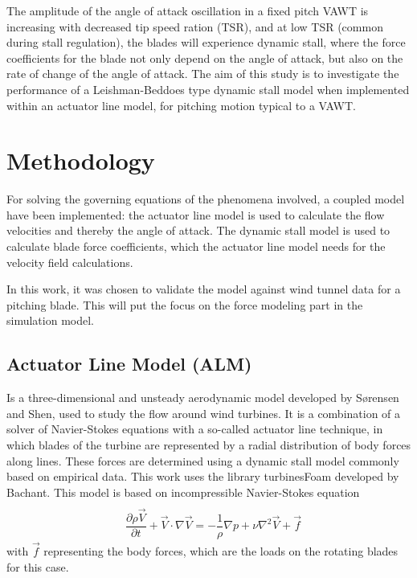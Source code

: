 \documentclass[a4paper]{jpconf}
\begin{document}
The amplitude of the angle of attack oscillation in a fixed pitch VAWT is increasing
with decreased tip speed
ration (TSR), and at low TSR (common during stall regulation), the blades will
experience dynamic stall, where the force coefficients for the blade not only
depend on the angle of attack, but also on the rate of change of the angle of
attack. The aim of this study is to investigate the performance of a
Leishman-Beddoes type dynamic stall model when implemented within an actuator
line model, for pitching motion typical to a VAWT.

\section{Methodology}
For solving the governing equations of the phenomena involved, a coupled model have
been implemented: the actuator line model is used to calculate the flow
velocities and thereby the angle of attack. The dynamic stall model is used to
calculate blade force coefficients, which the actuator line model needs for the
velocity field calculations.

In this work, it was chosen to validate the model
against wind tunnel data for a pitching blade. This will put the focus on the
force modeling part in the simulation model.

\subsection{Actuator Line Model (ALM)} Is a three-dimensional and unsteady aerodynamic
model developed by S{\o}rensen and Shen\cite{sorensen1999computation}, used to
study the flow around wind turbines. It is a combination of a solver of
Navier-Stokes equations with a so-called actuator line technique, in which
blades of the turbine are represented by a radial distribution of body forces
along lines. These forces are determined using a dynamic stall model commonly
based on empirical data. This work uses the library turbinesFoam developed by
Bachant\cite{bachant2015simulating}. This model is based on incompressible Navier-Stokes equation
\begin{align}
 & \nonumber \\ & \dfrac{\partial \rho \vec{V}}{\partial t} + \vec{V} \cdot \nabla \vec{V} = - \dfrac{1}{ \rho} \nabla p + \nu \nabla ^2 \vec{V} + \vec{f}	  \label{eqmom}  
\end{align} %
with $\vec{f}$ representing the body forces, which are the loads on the rotating blades for this case.
\end{document}
